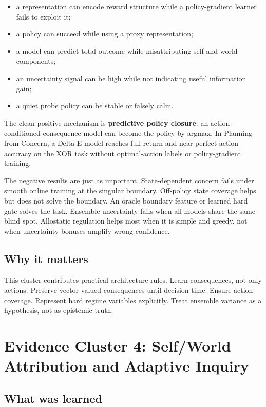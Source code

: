 \documentclass[11pt]{article}
\begin{document}
\begin{itemize}
  \item a representation can encode reward structure while a policy-gradient
  learner fails to exploit it;
  \item a policy can succeed while using a proxy representation;
  \item a model can predict total outcome while misattributing self and world
  components;
  \item an uncertainty signal can be high while not indicating useful
  information gain;
  \item a quiet probe policy can be stable or falsely calm.
\end{itemize}

The clean positive mechanism is \textbf{predictive policy closure}: an
action-conditioned consequence model can become the policy by argmax. In
Planning from Concern, a Delta-E model reaches full return and near-perfect
action accuracy on the XOR task without optimal-action labels or
policy-gradient training.

The negative results are just as important. State-dependent concern fails under
smooth online training at the singular boundary. Off-policy state coverage
helps but does not solve the boundary. An oracle boundary feature or learned
hard gate solves the task. Ensemble uncertainty fails when all models share the
same blind spot. Allostatic regulation helps most when it is simple and greedy,
not when uncertainty bonuses amplify wrong confidence.

\subsection{Why it matters}

This cluster contributes practical architecture rules. Learn consequences, not
only actions. Preserve vector-valued consequences until decision time. Ensure
action coverage. Represent hard regime variables explicitly. Treat ensemble
variance as a hypothesis, not as epistemic truth.

\section{Evidence Cluster 4: Self/World Attribution and Adaptive Inquiry}

\subsection{What was learned}
\end{document}
